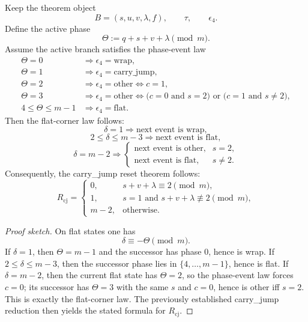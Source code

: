 \begin{proposition}
Keep the theorem object
\[
B=(s,u,v,\lambda,f),\qquad \tau,\qquad \epsilon_4.
\]
Define the active phase
\[
\Theta:=q+s+v+\lambda\pmod m.
\]
Assume the active branch satisfies the phase-event law
\begin{align*}
\Theta=0 &\Longrightarrow \epsilon_4=\mathrm{wrap},\\
\Theta=1 &\Longrightarrow \epsilon_4=\mathrm{carry\_jump},\\
\Theta=2 &\Longrightarrow \epsilon_4=\mathrm{other}\iff c=1,\\
\Theta=3 &\Longrightarrow \epsilon_4=\mathrm{other}\iff \bigl(c=0\text{ and }s=2\bigr)\text{ or }\bigl(c=1\text{ and }s\neq 2\bigr),\\
4\le \Theta\le m-1 &\Longrightarrow \epsilon_4=\mathrm{flat}.
\end{align*}
Then the flat-corner law follows:
\[
\delta=1 \Longrightarrow \text{next event is wrap},
\]
\[
2\le \delta\le m-3 \Longrightarrow \text{next event is flat},
\]
\[
\delta=m-2 \Longrightarrow
\begin{cases}
\text{next event is other},& s=2,\\
\text{next event is flat},& s\neq 2.
\end{cases}
\]
Consequently, the carry\_jump reset theorem follows:
\[
R_{\mathrm{cj}}=
\begin{cases}
0,& s+v+\lambda\equiv 2\pmod m,\\
1,& s=1\text{ and }s+v+\lambda\not\equiv 2\pmod m,\\
m-2,& \text{otherwise}.
\end{cases}
\]
\end{proposition}

\begin{proof}[Proof sketch]
On flat states one has
\[
\delta\equiv -\Theta\pmod m.
\]
If \(\delta=1\), then \(\Theta=m-1\) and the successor has phase \(0\), hence is wrap.
If \(2\le \delta\le m-3\), then the successor phase lies in \(\{4,\dots,m-1\}\), hence is flat.
If \(\delta=m-2\), then the current flat state has \(\Theta=2\), so the phase-event law forces \(c=0\); its successor has \(\Theta=3\) with the same \(s\) and \(c=0\), hence is other iff \(s=2\).
This is exactly the flat-corner law.  The previously established carry\_jump reduction then yields the stated formula for \(R_{\mathrm{cj}}\).
\end{proof}
